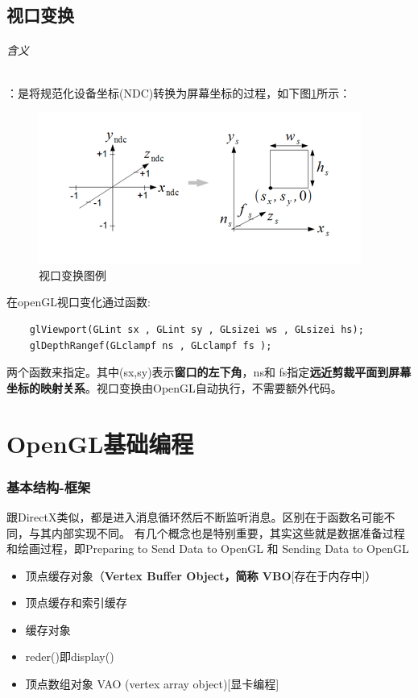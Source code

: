\documentclass[UTF8,a4paper,12pt]{ctexbook}
\begin{document}
	\section{视口变换}
		\subparagraph{含义}：是将规范化设备坐标(NDC)转换为屏幕坐标的过程，如下图\ref{shikou}所示：
			\begin{figure}[htbp]
				\centering
				\includegraphics[scale = 1.2]{viewPort.png}
				\caption{视口变换图例}
				\label{shikou}
			\end{figure}
			
			在openGL视口变化通过函数: 
			\begin{lstlisting}
	glViewport(GLint sx , GLint sy , GLsizei ws , GLsizei hs); 
	glDepthRangef(GLclampf ns , GLclampf fs );
			\end{lstlisting}
			
			两个函数来指定。其中(sx,sy)表示\textbf{窗口的左下角}，ns和 fs指定\textbf{远近剪裁平面到屏幕坐标的映射关系}。视口变换由OpenGL自动执行，不需要额外代码。
\chapter{OpenGL基础编程}
	
	\subsection{基本结构-框架}
		跟DirectX类似，都是进入消息循环然后不断监听消息。区别在于函数名可能不同，与其内部实现不同。
		有几个概念也是特别重要，其实这些就是数据准备过程和绘画过程，即Preparing to Send Data to OpenGL 和 Sending Data to OpenGL
		
		\begin{itemize}
			\item  顶点缓存对象（\textbf{Vertex Buffer Object，简称 VBO}[存在于内存中]）
			\item  顶点缓存和索引缓存
			\item  缓存对象
			\item  reder()即display()
			\item 顶点数组对象 VAO (vertex array object)[显卡编程]
		\end{itemize}
		
\end{document}
